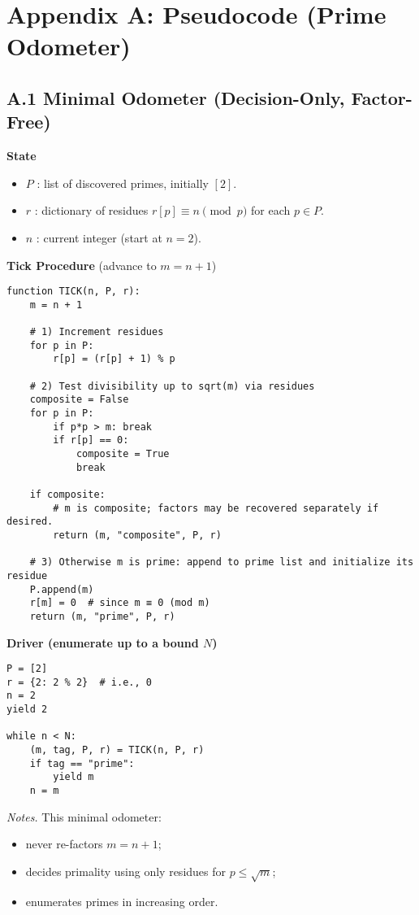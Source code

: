 \documentclass[12pt]{article}
\theoremstyle{definition}
\theoremstyle{remark}
\begin{document}

\section*{Appendix A: Pseudocode (Prime Odometer)}

\subsection*{A.1 Minimal Odometer (Decision-Only, Factor-Free)}


\noindent\textbf{State}
\begin{itemize}
  \item $P$ : list of discovered primes, initially $[2]$.
  \item $r$ : dictionary of residues $r[p] \equiv n \pmod p$ for each $p \in P$.
  \item $n$ : current integer (start at $n=2$).
\end{itemize}

\noindent\textbf{Tick Procedure} (advance to $m=n+1$)
\begin{verbatim}
function TICK(n, P, r):
    m = n + 1

    # 1) Increment residues
    for p in P:
        r[p] = (r[p] + 1) % p

    # 2) Test divisibility up to sqrt(m) via residues
    composite = False
    for p in P:
        if p*p > m: break
        if r[p] == 0:
            composite = True
            break

    if composite:
        # m is composite; factors may be recovered separately if desired.
        return (m, "composite", P, r)

    # 3) Otherwise m is prime: append to prime list and initialize its residue
    P.append(m)
    r[m] = 0  # since m ≡ 0 (mod m)
    return (m, "prime", P, r)
\end{verbatim}

\noindent\textbf{Driver (enumerate up to a bound \(N\))}
\begin{verbatim}
P = [2]
r = {2: 2 % 2}  # i.e., 0
n = 2
yield 2

while n < N:
    (m, tag, P, r) = TICK(n, P, r)
    if tag == "prime":
        yield m
    n = m
\end{verbatim}

\noindent\emph{Notes.} This minimal odometer:
\begin{itemize}
  \item never re-factors $m=n+1$;
  \item decides primality using only residues for $p \le \sqrt{m}$;
  \item enumerates primes in increasing order.
\end{itemize}
\end{document}
